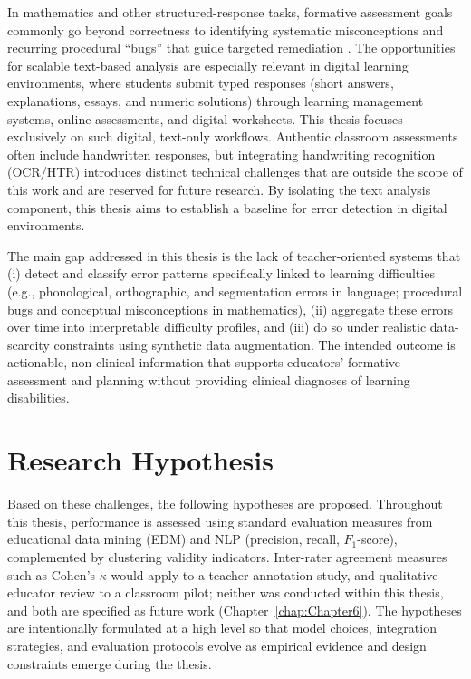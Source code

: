 In mathematics and other structured-response tasks, formative assessment goals commonly go beyond correctness to identifying systematic misconceptions and recurring procedural ``bugs'' that guide targeted remediation \parencite{VanLehn1990}. The opportunities for scalable text-based analysis are especially relevant in digital learning environments, where students submit typed responses (short answers, explanations, essays, and numeric solutions) through learning management systems, online assessments, and digital worksheets. This thesis focuses exclusively on such digital, text-only workflows. Authentic classroom assessments often include handwritten responses, but integrating handwriting recognition (OCR/HTR) introduces distinct technical challenges that are outside the scope of this work and are reserved for future research. By isolating the text analysis component, this thesis aims to establish a baseline for error detection in digital environments.\par

The main gap addressed in this thesis is the lack of teacher-oriented systems that (i) detect and classify error patterns specifically linked to learning difficulties (e.g., phonological, orthographic, and segmentation errors in language; procedural bugs and conceptual misconceptions in mathematics), (ii) aggregate these errors over time into interpretable difficulty profiles, and (iii) do so under realistic data-scarcity constraints using synthetic data augmentation. The intended outcome is actionable, non-clinical information that supports educators' formative assessment and planning without providing clinical diagnoses of learning disabilities.

\section{Research Hypothesis}
\label{sec:hypothesis}

Based on these challenges, the following hypotheses are proposed. Throughout this thesis, performance is assessed using standard evaluation measures from educational data mining (EDM) and NLP (precision, recall, \(F_1\)-score), complemented by clustering validity indicators. Inter-rater agreement measures such as Cohen's \(\kappa\) \parencite{Cohen1960} would apply to a teacher-annotation study, and qualitative educator review to a classroom pilot; neither was conducted within this thesis, and both are specified as future work (Chapter~\ref{chap:Chapter6}). The hypotheses are intentionally formulated at a high level so that model choices, integration strategies, and evaluation protocols evolve as empirical evidence and design constraints emerge during the thesis.

